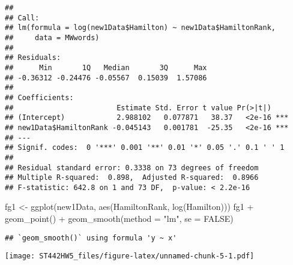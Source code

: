 \documentclass[
]{article}
\newenvironment{Shaded}{\begin{snugshade}}{\end{snugshade}}
\newcommand{\AttributeTok}[1]{\textcolor[rgb]{0.77,0.63,0.00}{#1}}
\newcommand{\ConstantTok}[1]{\textcolor[rgb]{0.00,0.00,0.00}{#1}}
\newcommand{\DecValTok}[1]{\textcolor[rgb]{0.00,0.00,0.81}{#1}}
\newcommand{\FunctionTok}[1]{\textcolor[rgb]{0.00,0.00,0.00}{#1}}
\newcommand{\NormalTok}[1]{#1}
\newcommand{\OtherTok}[1]{\textcolor[rgb]{0.56,0.35,0.01}{#1}}
\newcommand{\SpecialCharTok}[1]{\textcolor[rgb]{0.00,0.00,0.00}{#1}}
\newcommand{\StringTok}[1]{\textcolor[rgb]{0.31,0.60,0.02}{#1}}
\begin{document}
\begin{verbatim}
## 
## Call:
## lm(formula = log(new1Data$Hamilton) ~ new1Data$HamiltonRank, 
##     data = MWwords)
## 
## Residuals:
##      Min       1Q   Median       3Q      Max 
## -0.36312 -0.24476 -0.05567  0.15039  1.57086 
## 
## Coefficients:
##                        Estimate Std. Error t value Pr(>|t|)    
## (Intercept)            2.988102   0.077871   38.37   <2e-16 ***
## new1Data$HamiltonRank -0.045143   0.001781  -25.35   <2e-16 ***
## ---
## Signif. codes:  0 '***' 0.001 '**' 0.01 '*' 0.05 '.' 0.1 ' ' 1
## 
## Residual standard error: 0.3338 on 73 degrees of freedom
## Multiple R-squared:  0.898,  Adjusted R-squared:  0.8966 
## F-statistic: 642.8 on 1 and 73 DF,  p-value: < 2.2e-16
\end{verbatim}

\begin{Shaded}
\begin{Highlighting}[]
\NormalTok{fg1 }\OtherTok{\textless{}{-}} \FunctionTok{ggplot}\NormalTok{(new1Data, }\FunctionTok{aes}\NormalTok{(HamiltonRank, }\FunctionTok{log}\NormalTok{(Hamilton))) }
\NormalTok{fg1 }\SpecialCharTok{+} \FunctionTok{geom\_point}\NormalTok{() }\SpecialCharTok{+} \FunctionTok{geom\_smooth}\NormalTok{(}\AttributeTok{method =} \StringTok{"lm"}\NormalTok{, }\AttributeTok{se =} \ConstantTok{FALSE}\NormalTok{)}
\end{Highlighting}
\end{Shaded}

\begin{verbatim}
## `geom_smooth()` using formula 'y ~ x'
\end{verbatim}

\texttt{[image: ST442HW5\_files/figure-latex/unnamed-chunk-5-1.pdf]}

\begin{Shaded}
\end{Shaded}
\end{document}

